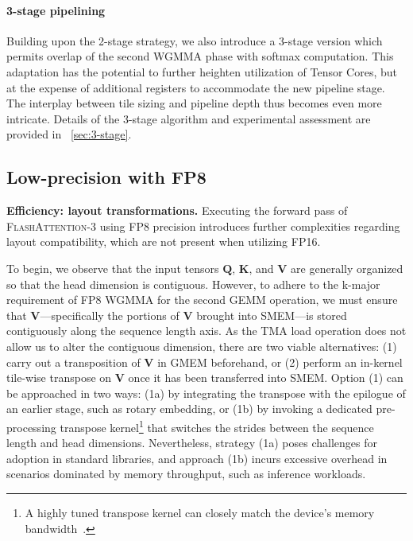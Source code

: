 \begin{enumerate}
\paragraph{3-stage pipelining} Building upon the 2-stage strategy, we also introduce a 3-stage version which permits overlap of the second WGMMA phase with softmax computation. This adaptation has the potential to further heighten utilization of Tensor Cores, but at the expense of additional registers to accommodate the new pipeline stage. The interplay between tile sizing and pipeline depth thus becomes even more intricate. Details of the 3-stage algorithm and experimental assessment are provided in ~\cref{sec:3-stage}.

\subsection{Low-precision with FP8}
\label{sec:algofp8}

\textbf{Efficiency: layout transformations.} Executing the forward pass of \textsc{FlashAttention-3} using FP8 precision introduces further complexities regarding layout compatibility, which are not present when utilizing FP16.

To begin, we observe that the input tensors $\mathbf{Q}$, $\mathbf{K}$, and $\mathbf{V}$ are generally organized so that the head dimension is contiguous. However, to adhere to the k-major requirement of FP8 WGMMA for the second GEMM operation, we must ensure that $\mathbf{V}$—specifically the portions of $\mathbf{V}$ brought into SMEM—is stored contiguously along the sequence length axis. As the TMA load operation does not allow us to alter the contiguous dimension, there are two viable alternatives: (1) carry out a transposition of $\mathbf{V}$ in GMEM beforehand, or (2) perform an in-kernel tile-wise transpose on $\mathbf{V}$ once it has been transferred into SMEM. Option (1) can be approached in two ways: (1a) by integrating the transpose with the epilogue of an earlier stage, such as rotary embedding, or (1b) by invoking a dedicated pre-processing transpose kernel\footnote{A highly tuned transpose kernel can closely match the device's memory bandwidth~\citep{colfax_cutlass_transpose_2024}.} that switches the strides between the sequence length and head dimensions. Nevertheless, strategy (1a) poses challenges for adoption in standard libraries, and approach (1b) incurs excessive overhead in scenarios dominated by memory throughput, such as inference workloads.


\end{enumerate}
